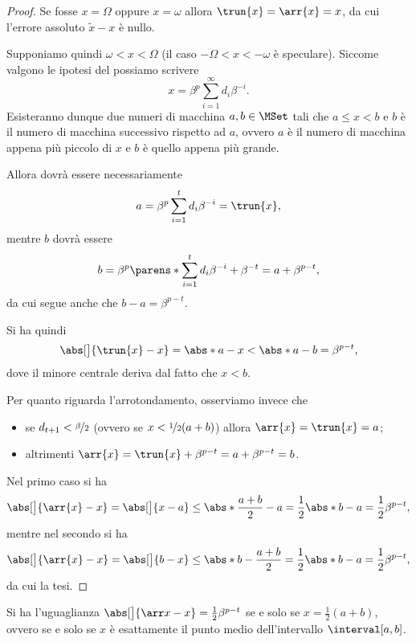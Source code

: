 \begin{proof}
    Se fosse $x = \Omega$ oppure $x = \omega$  allora $\trun{x} = \arr{x} = x$, da cui l'errore assoluto $\tilde x - x$ è nullo.  

    Supponiamo quindi $\omega < x < \Omega$ (il caso $-\Omega < x < -\omega$ è speculare). Siccome valgono le ipotesi del  possiamo scrivere \[
        x = \beta^p\sum_{i=1}^\infty d_i\beta^{-i}.
    \] Esisteranno dunque due numeri di macchina $a, b \in \MSet$ tali che $a \leq x < b$ e $b$ è il numero di macchina successivo rispetto ad $a$, ovvero $a$ è il numero di macchina appena più piccolo di $x$ e $b$ è quello appena più grande.

    Allora dovrà essere necessariamente \[
        a = \beta^p\sum_{i=1}^t d_i\beta^{-i} = \trun{x},
    \] mentre $b$ dovrà essere \[
        b = \beta^p\parens*{\sum_{i=1}^t d_i\beta^{-i} + \beta^{-t}} = a + \beta^{p-t},
    \] da cui segue anche che $b - a = \beta^{p-t}$. 

    Si ha quindi \[
        \abs[\big]{\trun{x} - x} 
            = \abs*{a - x}
            < \abs*{a - b} 
            = \beta^{p-t},
    \] dove il minore centrale deriva dal fatto che $x < b$.
    
    Per quanto riguarda l'arrotondamento, osserviamo invece che \begin{itemize}
        \item se $d_{t+1} < \nicefrac{\beta}{2}$ (ovvero se $x < \nicefrac12(a + b)$) allora $\arr{x} = \trun{x} = a$;
        \item altrimenti $\arr{x} = \trun{x} + \beta^{p-t} = a + \beta^{p-t} = b$.
    \end{itemize}

    Nel primo caso si ha \[
        \abs[\big]{\arr{x} - x} 
            =    \abs[\big]{x - a}
            \leq \abs*{\frac{a+b}{2} - a} 
            =    \frac12\abs*{b-a} 
            =    \frac12\beta^{p-t},
    \] mentre nel secondo si ha 
    \[
        \abs[\big]{\arr{x} - x} 
            =    \abs[\big]{b - x}
            \leq \abs*{b - \frac{a+b}{2}} 
            =    \frac12\abs*{b - a} 
            =    \frac12\beta^{p-t},
    \] da cui la tesi.
\end{proof} 

\begin{remark}
    \label{rem:abs_err_arr} Si ha l'uguaglianza $\abs[\big]{\arr x - x} = \frac12\beta^{p-t}$ se e solo se $x = \frac12(a + b)$, ovvero se e solo se $x$ è esattamente il punto medio dell'intervallo $\interval[{a, b}]$.
\end{remark}

